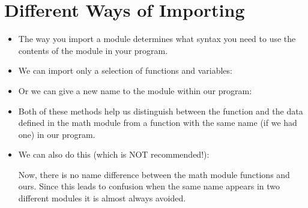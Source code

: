 \documentclass[letterpaper,10pt,english]{sphinxmanual}
\begin{document}
\section{Different Ways of Importing}
\label{\detokenize{lecture_notes/lec04_modules_functions1:different-ways-of-importing}}\begin{itemize}
\item {} 
The way you import a module determines what syntax you need to use
the contents of the module in your program.

\item {} 
We can import only a selection of functions and variables:

%
\begin{sphinxVerbatim}[commandchars=\\\{\}]
   
\end{sphinxVerbatim}

\item {} 
Or we can give a new name to the module within our program:

%
\begin{sphinxVerbatim}[commandchars=\\\{\}]
   
\end{sphinxVerbatim}

\item {} 
Both of these methods help us distinguish between the function
 and the data  defined in the math module from a
function with the same name (if we had one) in our program.

\item {} 
We can also do this (which is NOT recommended!):

%
\begin{sphinxVerbatim}[commandchars=\\\{\}]
   
\end{sphinxVerbatim}

Now, there is no name difference between the math module functions
and ours. Since this leads to confusion when the same name appears
in two different modules it is almost always avoided.

\end{itemize}
\end{document}

